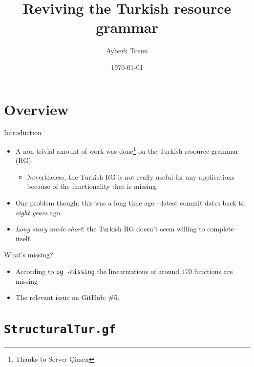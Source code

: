 \documentclass{beamer}
\title{Reviving the Turkish resource grammar}
\date{\today}
\author{Ayberk Tosun}
\institute{Fifth GF Summer School}
\begin{document}
  \maketitle

  \section{Overview}

  \begin{frame}{Introduction}
    \begin{itemize}
      \item<1-> A non-trivial amount of work was done\footnote{Thanks to Server
        \c{C}imen} on the Turkish resource grammar (RG).
        \begin{itemize}
          \item<2-> Nevertheless, the Turkish RG is not really useful for any
            applications because of the functionality that is missing.
        \end{itemize}
      \item<3-> \alert{One problem though}: this was a long time ago---latest
        commit dates back to \emph{eight years} ago.
      \item<4-> \emph{Long story made short}: the Turkish RG doesn't seem
        willing to complete itself.
    \end{itemize}
  \end{frame}

  \begin{frame}{What's missing?}
    \begin{itemize}
      \item<1-> According to \texttt{pg -missing} the linearizations of around
        $470$ functions are missing
      \item<2-> The relevant issue on GitHub: \alert{\#5}.
    \end{itemize}
  \end{frame}

  \section{\texttt{StructuralTur.gf}}
\end{document}
